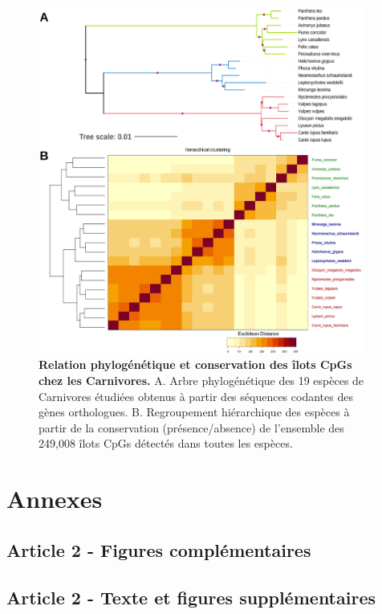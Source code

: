 \begin{figure}[h]
    \centering
    \includegraphics[width=0.95\textwidth, page=1] {figures/annexes/Canidae-fig1.png}
    \caption[Relation phylogénétique et conservation des îlots CpGs chez les Carnivores.]{
    \textbf{Relation phylogénétique et conservation des îlots CpGs chez les Carnivores.}
    A. Arbre phylogénétique des 19 espèces de Carnivores étudiées obtenus à partir des séquences codantes des gènes orthologues.
    B. Regroupement hiérarchique des espèces à partir de la conservation (présence/absence) de l'ensemble des 249,008 îlots CpGs détectés dans toutes les espèces.\\
    }
    \label{fig:canidae}
\end{figure} 


\chapter{Annexes}
{\hypersetup{linkcolor=GREYDARK}\minitoc}
\label{chap:annexes}

\newpage
\section{Article 2 - Figures complémentaires}


\newpage
\section{Article 2 - Texte et figures supplémentaires}


